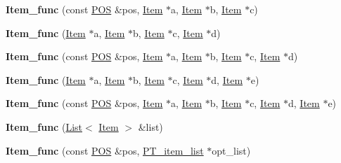 \begin{DoxyCompactItemize}
{\bfseries Item\+\_\+func} (const \mbox{\hyperlink{structYYLTYPE}{P\+OS}} \&pos, \mbox{\hyperlink{classItem}{Item}} $\ast$a, \mbox{\hyperlink{classItem}{Item}} $\ast$b, \mbox{\hyperlink{classItem}{Item}} $\ast$c)
\item 
\mbox{\label{classItem__func_a8d4ac9dc44531a2ccb83d93e4707770a}} 
{\bfseries Item\+\_\+func} (\mbox{\hyperlink{classItem}{Item}} $\ast$a, \mbox{\hyperlink{classItem}{Item}} $\ast$b, \mbox{\hyperlink{classItem}{Item}} $\ast$c, \mbox{\hyperlink{classItem}{Item}} $\ast$d)
\item 
\mbox{\label{classItem__func_a82a2a3960b35e2b8cdb09bb9407db0bf}} 
{\bfseries Item\+\_\+func} (const \mbox{\hyperlink{structYYLTYPE}{P\+OS}} \&pos, \mbox{\hyperlink{classItem}{Item}} $\ast$a, \mbox{\hyperlink{classItem}{Item}} $\ast$b, \mbox{\hyperlink{classItem}{Item}} $\ast$c, \mbox{\hyperlink{classItem}{Item}} $\ast$d)
\item 
\mbox{\label{classItem__func_aad088019a6ce483049402b74566b9385}} 
{\bfseries Item\+\_\+func} (\mbox{\hyperlink{classItem}{Item}} $\ast$a, \mbox{\hyperlink{classItem}{Item}} $\ast$b, \mbox{\hyperlink{classItem}{Item}} $\ast$c, \mbox{\hyperlink{classItem}{Item}} $\ast$d, \mbox{\hyperlink{classItem}{Item}} $\ast$e)
\item 
\mbox{\label{classItem__func_a57f627e27e589d390daaba251f35cfd0}} 
{\bfseries Item\+\_\+func} (const \mbox{\hyperlink{structYYLTYPE}{P\+OS}} \&pos, \mbox{\hyperlink{classItem}{Item}} $\ast$a, \mbox{\hyperlink{classItem}{Item}} $\ast$b, \mbox{\hyperlink{classItem}{Item}} $\ast$c, \mbox{\hyperlink{classItem}{Item}} $\ast$d, \mbox{\hyperlink{classItem}{Item}} $\ast$e)
\item 
\mbox{\label{classItem__func_a052dbea9913c48276cc627ace8f080a1}} 
{\bfseries Item\+\_\+func} (\mbox{\hyperlink{classList}{List}}$<$ \mbox{\hyperlink{classItem}{Item}} $>$ \&list)
\item 
\mbox{\label{classItem__func_a6787c4714dd6232c64803c243b04484b}} 
{\bfseries Item\+\_\+func} (const \mbox{\hyperlink{structYYLTYPE}{P\+OS}} \&pos, \mbox{\hyperlink{classPT__item__list}{P\+T\+\_\+item\+\_\+list}} $\ast$opt\+\_\+list)
\item 

\end{DoxyCompactItemize}
